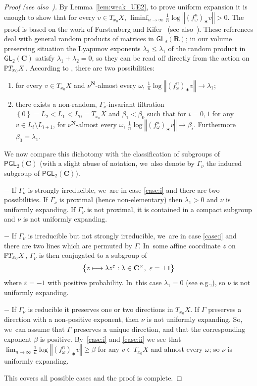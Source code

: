 \documentclass[11pt]{article}
\newcommand{\eg}{e.g.,\xspace}
\newenvironment{enumeratei}
{\bgroup\def\theenumi{\roman{enumi}}\def\theenumii{\arabic{enumii}}\begin{enumerate}}
{\end{enumerate}\egroup}
\newcommand\mto{\mathchoice{\longmapsto}{\mapsto}{\mapsto}{\mapsto}}
\let\sep :
\let\e\varepsilon
\newcommand{\set}[1]{\left\{#1\right\}}
\newcommand{\norm}[1]{{\left\Vert#1\right\Vert}}
\newcommand{\unsur}[1]{\frac{1}{#1}}
\def\C{\mathbf{C}}
\def\R{\mathbf{R}}
\def\N{\mathbf{N}}
\newcommand\PGL{{\mathsf{PGL}}}
\newcommand\GL{{\mathsf{GL}}}
\theoremstyle{plain}
\theoremstyle{definition}
\numberwithin{equation}{section}
\begin{document}
\begin{proof}[Proof (see also~\cite{Prohaska-Sert:TAMS})]
By Lemma~\ref{lem:weak_UE2}, to prove uniform expansion it is enough to show that for every $ v\in T_{x_0}X$, $\liminf_{n\to\infty}\unsur{n}\log \norm{(f_\omega^n)_\varstar v} >0$.
The proof is based on the work of Furstenberg and Kifer~\cite{furstenberg-kifer} (see also~\cite[\S 3.7]{bougerol-lacroix}). These references deal with general random products of matrices in $\GL_d(\R)$; in our volume preserving situation the Lyapunov exponents $\lambda_2\leq \lambda_1$ of the random
product in $\GL_2(\C)$
satisfy $\lambda_1+\lambda_2=0$, so they can be read off directly from the action
on
$\P T_{x_0}X$. According to \cite[Th.\,3.5 \& 3.9]{furstenberg-kifer}, there are two possibilities:
\begin{enumeratei}
\item\label{case:i} for every $ v\in T_{x_0}X$ and $\nu^\N$-almost every $\omega$, $\unsur{n}\log \norm{(f_\omega^n)_\varstar v} \to \lambda_1$;
\item\label{case:ii} there
exists a
non-random, $\Gamma_\nu$-invariant filtration $\set{0}=L_2< L_1< L_0 = T_{x_0}X$
and $\beta_1<\beta_0$
such that for $i=0,1$ for any $ v\in L_{i}\setminus L_{i+1}$, for $\nu^\N$-almost every $\omega$,
$\unsur{n}\log \norm{(f_\omega^n)_\varstar v} \to \beta_i$. Furthermore $\beta_0= \lambda_1$.
\end{enumeratei}
We now compare this dichotomy with the classification of subgroups of $\PGL_2(\C)$ (with a slight abuse of notation, we~also denote by $\Gamma_\nu$ the induced subgroup of $\PGL_2(\C)$).

$-$ If $\Gamma_\nu$ is strongly irreducible, we~are in case \eqref{case:i} and there are two possibilities.
If $\Gamma_\nu$ is proximal (hence non-elementary)
then $\lambda_1>0$ and $\nu$ is uniformly expanding. If $\Gamma_\nu$ is not proximal, it is contained in a
compact subgroup and $\nu$ is not uniformly expanding.

$-$ If $\Gamma_\nu$ is irreducible but not strongly irreducible, we~are in case \eqref{case:i} and there are two lines which are permuted by $\Gamma$. In~some affine coordinate $z$ on $\P T_{x_0}X$, $\Gamma_\nu$ is then conjugated to a subgroup of
\begin{equation*}
\set{z\mto \lambda z^{\e}\sep \lambda\in \C^\times, \ \e = \pm 1}
\end{equation*} where $\e=- 1$ with positive probability. In~this case $\lambda_1 = 0$ (see \eg \cite[Prop.\,5.3]{degenerations_SL2}), so $\nu$ is not uniformly expanding.

$-$ If $\Gamma_\nu$ is reducible it preserves one or two directions in $T_{x_0}X$. If $\Gamma$ preserves a direction with a non-positive exponent, then $\nu$ is not uniformly expanding. So, we~can assume that $\Gamma$ preserves a unique direction, and that the corresponding exponent $\beta$ is positive. By~\eqref{case:i} and \eqref{case:ii} we see that $\lim_{n\to\infty}\unsur{n}\log \norm{(f^n_\omega)_\varstar v}\geq \beta$ for any $ v\in T_{x_0}X$ and almost every $\omega$; so
$\nu$ is uniformly expanding.

This covers all possible cases and the proof is complete.
\end{proof}
\end{document}
